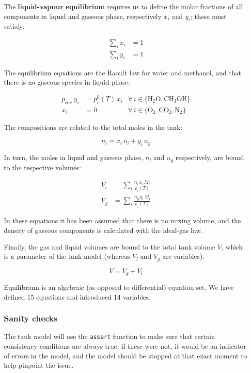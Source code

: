 \documentclass[a4paper]{article}
\begin{document}
The \textbf{liquid-vapour equilibrium} requires us to define the molar fractions
of all components in liquid and gaseous phase, respectively $x_i$ and $y_i$;
these must satisfy:

\begin{align}
\sum_i x_i &= 1\\
\sum_i y_i &= 1
\end{align}

The equilibrium equations are the Raoult law for water and methanol, and that
there is no gaseous species in liquid phase:

\begin{align}
p_\text{env} \, y_i &= p^0_i(T) \, x_i & \forall \, i \in \lbrace \mathrm{H_2O, CH_3OH} \rbrace\\
x_i &= 0 & \forall \, i \in \lbrace \mathrm{O_2, CO_2, N_2} \rbrace
\end{align}

The compositions are related to the total moles in the tank:

\begin{equation}
n_i = x_i \, n_l + y_i \, n_g
\end{equation}

In turn, the moles in liquid and gaseous phase,  $n_l$ and $n_g$ respectively,
are bound to the respective volumes:

\begin{align}
V_l &= \sum_i \frac{n_l \, x_i \, M_i}{\rho_i(T)}\\
V_g &= \sum_i \frac{n_g \, y_i \, M_i}{\rho_i(T)}
\end{align}

In these equations it has been assumed that there is no mixing volume, and the
density of gaseous components is calculated with the ideal-gas law.

Finally, the gas and liquid volumes are bound to the total tank volume $V$,
which is a parameter of the tank model (whereas $V_l$ and $V_g$ are variables).

\begin{equation}
V = V_g + V_l
\end{equation}

Equilibrium is an algebraic (as opposed to differential) equation set. We have
defined 15 equations and introduced 14 variables.

\subsubsection{Sanity checks}
The tank model will use the \texttt{assert} function to make sure that certain
consistency conditions are always true: if these were not, it would be an
indicator of errors in the model, and the model should be stopped at that exact
moment to help pinpoint the issue.
\end{document}
